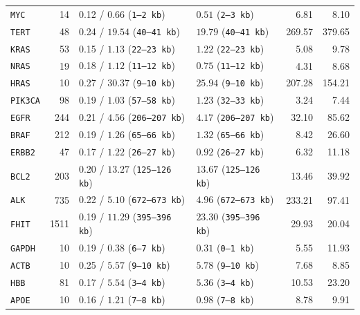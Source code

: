 \documentclass[11pt, a4paper]{article}
\DeclareRobustCommand{\_}{\textunderscore\allowbreak}
\begin{document}
\begin{table}[htbp]
{\begin{tabular}{@{}lrllrr@{}}
\midrule
\texttt{MYC}    &   14 & 0.12 / $\mathbf{0.66}$ (\texttt{1--2 kb})     & $\mathbf{0.51}$ (\texttt{2--3 kb})     &   6.81 &    8.10 \\
\texttt{TERT}   &   48 & 0.24 / $\mathbf{19.54}$ (\texttt{40--41 kb})  & $\mathbf{19.79}$ (\texttt{40--41 kb})  & 269.57 &  379.65 \\
\texttt{KRAS}   &   53 & 0.15 / $\mathbf{1.13}$ (\texttt{22--23 kb})   & $\mathbf{1.22}$ (\texttt{22--23 kb})   &   5.08 &    9.78 \\
\texttt{NRAS}   &   19 & 0.18 / $\mathbf{1.12}$ (\texttt{11--12 kb})   & $\mathbf{0.75}$ (\texttt{11--12 kb})   &   4.31 &    8.68 \\
\texttt{HRAS}   &   10 & 0.27 / $\mathbf{30.37}$ (\texttt{9--10 kb})   & $\mathbf{25.94}$ (\texttt{9--10 kb})   & 207.28 &  154.21 \\
\texttt{PIK3CA} &   98 & 0.19 / $\mathbf{1.03}$ (\texttt{57--58 kb})   & $\mathbf{1.23}$ (\texttt{32--33 kb})   &   3.24 &    7.44 \\
\texttt{EGFR}   &  244 & 0.21 / $\mathbf{4.56}$ (\texttt{206--207 kb}) & $\mathbf{4.17}$ (\texttt{206--207 kb}) &  32.10 &   85.62 \\
\texttt{BRAF}   &  212 & 0.19 / $\mathbf{1.26}$ (\texttt{65--66 kb})   & $\mathbf{1.32}$ (\texttt{65--66 kb})   &   8.42 &   26.60 \\
\texttt{ERBB2}  &   47 & 0.17 / $\mathbf{1.22}$ (\texttt{26--27 kb})   & $\mathbf{0.92}$ (\texttt{26--27 kb})   &   6.32 &   11.18 \\
\texttt{BCL2}   &  203 & 0.20 / $\mathbf{13.27}$ (\texttt{125--126 kb})& $\mathbf{13.67}$ (\texttt{125--126 kb})&  13.46 &   39.92 \\
\texttt{ALK}    &  735 & 0.22 / $\mathbf{5.10}$ (\texttt{672--673 kb}) & $\mathbf{4.96}$ (\texttt{672--673 kb}) & 233.21 &   97.41 \\
\texttt{FHIT}   & 1511 & 0.19 / $\mathbf{11.29}$ (\texttt{395--396 kb})& $\mathbf{23.30}$ (\texttt{395--396 kb})&  29.93 &   20.04 \\
\midrule
\texttt{GAPDH}  &   10 & 0.19 / $\mathbf{0.38}$ (\texttt{6--7 kb})     & $\mathbf{0.31}$ (\texttt{0--1 kb})     &   5.55 &   11.93 \\
\texttt{ACTB}   &   10 & 0.25 / $\mathbf{5.57}$ (\texttt{9--10 kb})    & $\mathbf{5.78}$ (\texttt{9--10 kb})    &   7.68 &    8.85 \\
\texttt{HBB}    &   81 & 0.17 / $\mathbf{5.54}$ (\texttt{3--4 kb})     & $\mathbf{5.36}$ (\texttt{3--4 kb})     &  10.53 &   23.20 \\
\texttt{APOE}   &   10 & 0.16 / $\mathbf{1.21}$ (\texttt{7--8 kb})     & $\mathbf{0.98}$ (\texttt{7--8 kb})     &   8.78 &    9.91 \\
\bottomrule
\end{tabular}
}
\end{table}
\end{document}
